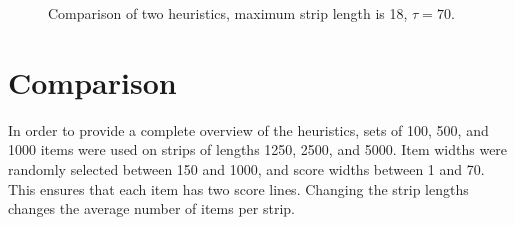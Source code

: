 \documentclass[oribibl]{llncs}
\begin{document}
\begin{figure}[h!]	
	\centering
	
	\caption{Comparison of two heuristics, maximum strip length is 18, $\tau = 70$.}	
	\label{fig:comparestrips}
\end{figure}

\section{Comparison}
In order to provide a complete overview of the heuristics, sets of 100, 500, and 1000 items were used on strips of lengths 1250, 2500, and 5000. Item widths were randomly selected between 150 and 1000, and score widths between 1 and 70. This ensures that each item has two score lines. Changing the strip lengths changes the average number of items per strip. 
\end{document}
